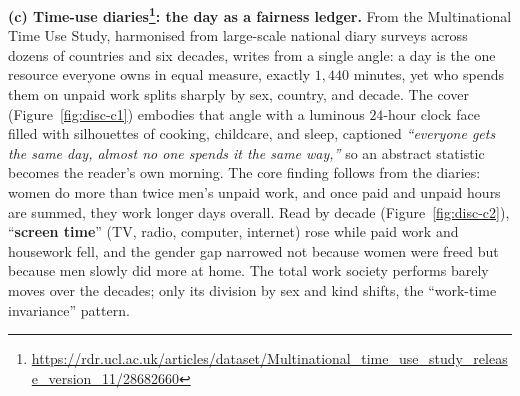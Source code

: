 \textbf{(c) Time-use diaries\footnote{\url{https://rdr.ucl.ac.uk/articles/dataset/Multinational_time_use_study_release_version_11/28682660}}: the day as a fairness ledger.} From the Multinational Time Use Study, harmonised from large-scale national diary surveys across dozens of countries and six decades, \methodshort{} writes from a single angle: a day is the one resource everyone owns in equal measure, exactly $1{,}440$ minutes, yet who spends them on unpaid work splits sharply by sex, country, and decade. The cover (Figure~\ref{fig:disc-c1}) embodies that angle with a luminous $24$-hour clock face filled with silhouettes of cooking, childcare, and sleep, captioned \textit{``everyone gets the same day, almost no one spends it the same way,''} so an abstract statistic becomes the reader's own morning. The core finding follows from the diaries: women do more than twice men's unpaid work, and once paid and unpaid hours are summed, they work longer days overall.
Read by decade (Figure~\ref{fig:disc-c2}), “\textbf{screen time}” (TV, radio, computer, internet) rose while paid work and housework fell, and the gender gap narrowed not because women were freed but because men slowly did more at home. The total work society performs barely moves over the decades; only its division by sex and kind shifts, the ``work-time invariance'' pattern.
